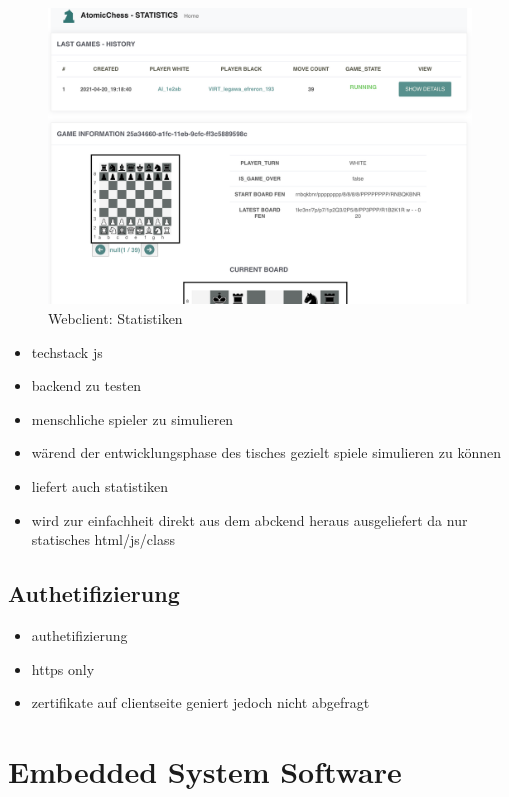 \begin{figure}
\centering
\includegraphics{images/ATC_statistics.png}
\caption{Webclient: Statistiken}
\end{figure}

\begin{itemize}
\item
  techstack js
\item
  backend zu testen
\item
  menschliche spieler zu simulieren
\item
  wärend der entwicklungsphase des tisches gezielt spiele simulieren zu
  können
\item
  liefert auch statistiken
\item
  wird zur einfachheit direkt aus dem abckend heraus ausgeliefert da nur
  statisches html/js/class
\end{itemize}

\hypertarget{authetifizierung}{%
\subsection{Authetifizierung}\label{authetifizierung}}

\begin{itemize}
\tightlist
\item
  authetifizierung
\item
  https only
\item
  zertifikate auf clientseite geniert jedoch nicht abgefragt
\end{itemize}

\hypertarget{embedded-system-software}{%
\section{Embedded System Software}\label{embedded-system-software}}

